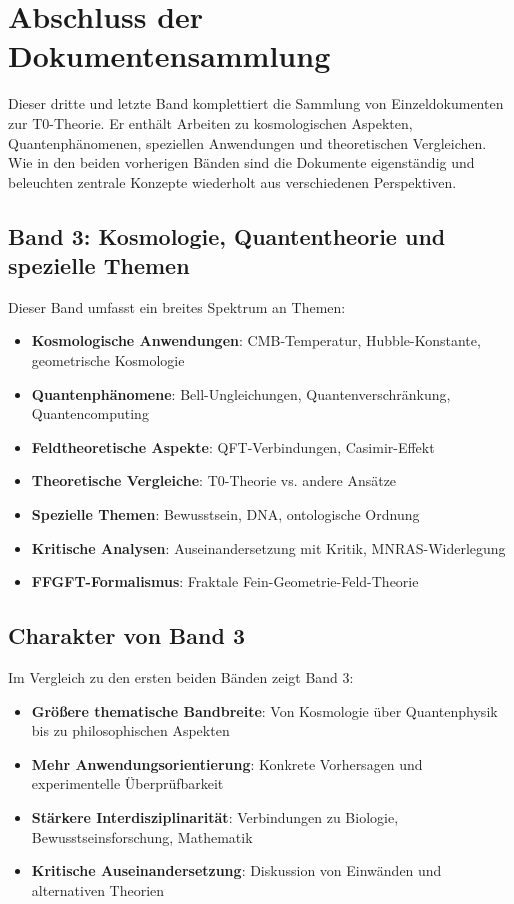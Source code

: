 \section*{Abschluss der Dokumentensammlung}

Dieser dritte und letzte Band komplettiert die Sammlung von Einzeldokumenten zur T0-Theorie. Er enthält Arbeiten zu kosmologischen Aspekten, Quantenphänomenen, speziellen Anwendungen und theoretischen Vergleichen. Wie in den beiden vorherigen Bänden sind die Dokumente eigenständig und beleuchten zentrale Konzepte wiederholt aus verschiedenen Perspektiven.

\subsection*{Band 3: Kosmologie, Quantentheorie und spezielle Themen}

Dieser Band umfasst ein breites Spektrum an Themen:

\begin{itemize}
\item \textbf{Kosmologische Anwendungen}: CMB-Temperatur, Hubble-Konstante, geometrische Kosmologie
\item \textbf{Quantenphänomene}: Bell-Ungleichungen, Quantenverschränkung, Quantencomputing
\item \textbf{Feldtheoretische Aspekte}: QFT-Verbindungen, Casimir-Effekt
\item \textbf{Theoretische Vergleiche}: T0-Theorie vs. andere Ansätze
\item \textbf{Spezielle Themen}: Bewusstsein, DNA, ontologische Ordnung
\item \textbf{Kritische Analysen}: Auseinandersetzung mit Kritik, MNRAS-Widerlegung
\item \textbf{FFGFT-Formalismus}: Fraktale Fein-Geometrie-Feld-Theorie
\end{itemize}

\subsection*{Charakter von Band 3}

Im Vergleich zu den ersten beiden Bänden zeigt Band 3:

\begin{itemize}
\item \textbf{Größere thematische Bandbreite}: Von Kosmologie über Quantenphysik bis zu philosophischen Aspekten
\item \textbf{Mehr Anwendungsorientierung}: Konkrete Vorhersagen und experimentelle Überprüfbarkeit
\item \textbf{Stärkere Interdisziplinarität}: Verbindungen zu Biologie, Bewusstseinsforschung, Mathematik
\item \textbf{Kritische Auseinandersetzung}: Diskussion von Einwänden und alternativen Theorien
\end{itemize}

